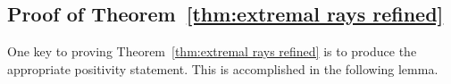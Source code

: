 \documentclass[12pt]{amsart}
\newtheorem{lemma}{Lemma}[section]
\theoremstyle{definition}
\theoremstyle{remark}
\newcommand{\PP}{\mathbb{P}}
\newcommand{\bb}{\mathbf{b}}
\newcommand{\cE}{\mathcal{E}}
\newcommand{\FF}{\mathbf{F}}
\newcommand{\DD}{\mathrm{D}}
\begin{document}
\subsection{Proof of Theorem~\ref{thm:extremal rays refined}}\label{sec:refined}

One key to proving Theorem~\ref{thm:extremal rays refined} is to produce the appropriate positivity statement.  This is accomplished in the following lemma.


\end{document}
